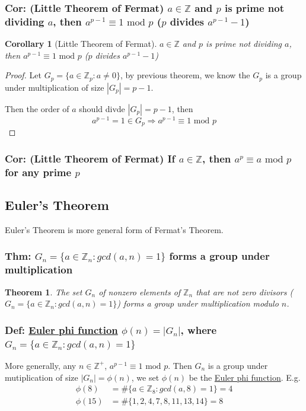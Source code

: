 \documentclass[11pt,a4paper]{article}
\newtheorem{theorem}{Theorem}
\newtheorem{corollary}{Corollary}
\begin{document}
\subsubsection{Cor: (Little Theorem of Fermat) $a\in \mathbb{Z}$ and $p$ is prime not dividing $a$, then $a^{p-1}\equiv 1 \text{ mod } p$ ($p$ divides $a^{p-1}-1$)}
\begin{corollary}[Little Theorem of Fermat]
    $a\in \mathbb{Z}$ and $p$ is prime not dividing $a$, then $a^{p-1}\equiv 1 \text{ mod } p$ ($p$ divides $a^{p-1}-1$)
\end{corollary}
\begin{proof}
Let $G_p=\{a\in \mathbb{Z}_p: a\neq 0\}$, by previous theorem, we know the $G_p$ is a group under multiplication of size $|G_p|=p-1$.

Then the order of $a$ should divde $|G_p|=p-1$, then
$$a^{p-1}=1\in G_p \Rightarrow	a^{p-1}\equiv 1 \text{ mod } p$$
\end{proof}
\subsubsection{Cor: (Little Theorem of Fermat) If $a\in \mathbb{Z}$, then $a^p\equiv a \text{ mod }p$ for any prime $p$}

\subsection{Euler's Theorem}
Euler's Theorem is more general form of Fermat's Theorem.
\subsubsection{Thm: $G_n=\{a\in \mathbb{Z}_n: gcd(a,n)=1\}$ forms a group under multiplication}
\begin{theorem}
    The set $G_n$ of nonzero elements of $\mathbb{Z}_n$ that are not zero divisors ($G_n=\{a\in \mathbb{Z}_n: gcd(a,n)=1\}$) forms a group under multiplication modulo $n$.
\end{theorem}
\subsubsection{Def: \underline{Euler phi function} $\phi(n)=|G_n|$, where $G_n=\{a\in \mathbb{Z}_n: gcd(a,n)=1\}$}
More generally, any $n\in \mathbb{Z}^+$, $a^{p-1}\equiv 1 \text{ mod } p$. Then $G_n$ is a group under mutiplication of size $|G_n|=\phi(n)$, we set $\phi(n)$ be the \underline{Euler phi function}.
E.g. 
\begin{equation}
    \begin{aligned}
        \phi(8)&=\#\{a\in \mathbb{Z}_8: gcd(a,8)=1\}=4\\
        \phi(15)&=\#\{1,2,4,7,8,11,13,14\}=8\\
    \end{aligned}
    \nonumber
\end{equation}
\end{document}
